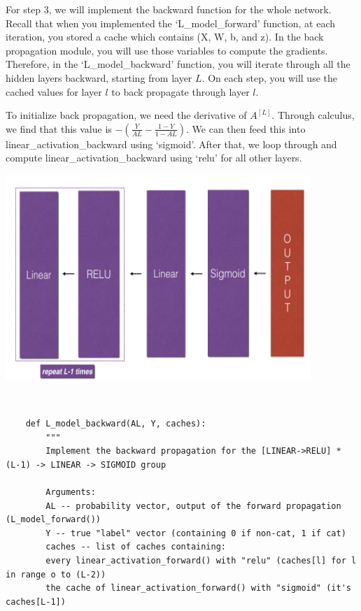 \documentclass[11pt, a4paper]{article}
\begin{document}
\begin{spacing}{1.1}
	\noindent For step 3, we will implement the backward function for the whole network. Recall that when you implemented the `L\_model\_forward' function, at each iteration, you stored a cache which contains (X, W, b, and z). In the back propagation module, you will use those variables to compute the gradients. Therefore, in the `L\_model\_backward' function, you will iterate through all the hidden layers backward, starting from layer $L$. On each step, you will use the cached values for layer $l$ to back propagate through layer $l$.
	\begin{minipage}[c]{8.3cm}
	To initialize back propagation, we need the derivative of $A^{[L]}$. Through calculus, we find that this value is $-(\frac{Y}{AL} - \frac{1-Y}{1-AL})$. We can then feed this into linear\_activation\_backward using `sigmoid'. After that, we loop through and compute linear\_activation\_backward using `relu' for all other layers.
	\end{minipage}
	\begin{minipage}[c]{9cm}
	\hspace*{6mm} \includegraphics[scale=.7]{l_back_prop}
	\end{minipage} \\
	\begin{lstlisting}
	def L_model_backward(AL, Y, caches):
		"""
		Implement the backward propagation for the [LINEAR->RELU] * (L-1) -> LINEAR -> SIGMOID group
		
		Arguments:
		AL -- probability vector, output of the forward propagation (L_model_forward())
		Y -- true "label" vector (containing 0 if non-cat, 1 if cat)
		caches -- list of caches containing:
		every linear_activation_forward() with "relu" (caches[l] for l in range o to (L-2))
		the cache of linear_activation_forward() with "sigmoid" (it's caches[L-1])
		

\end{lstlisting}
\end{spacing}
\end{document}
